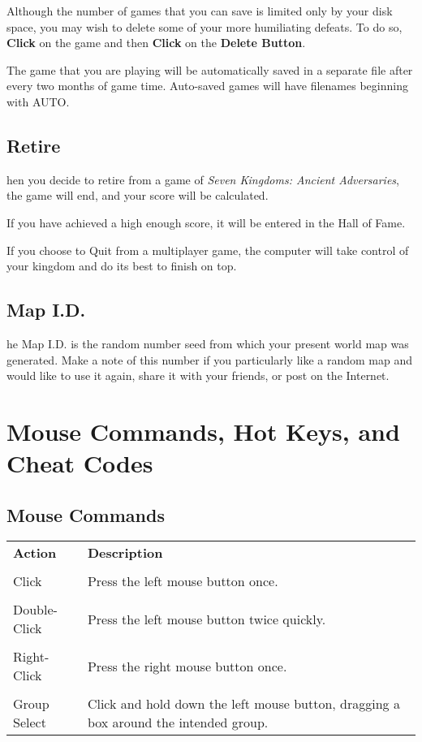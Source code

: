 Although the number of games that you can save is limited only by your disk space, you may wish to delete some of your more humiliating defeats. To do so, \textbf{Click} on the game and then \textbf{Click} on the \textbf{Delete Button}.

The game that you are playing will be automatically saved in a separate file after every two months of game time. Auto-saved games will have filenames beginning with AUTO.

\subsection{\textsf{Retire}}


hen you decide to retire from a game of \textit{Seven Kingdoms: Ancient Adversaries}, the game will end, and your score will be calculated.

If you have achieved a high enough score, it will be entered in the Hall of Fame.

If you choose to Quit from a multiplayer game, the computer will take control of your kingdom and do its best to finish on top.

\subsection{\textsf{Map I.D.}}


he Map I.D. is the random number seed from which your present world map was generated. Make a note of this number if you particularly like a random map and would like to use it again, share it with your friends, or post on the Internet.

\section{\textsf{Mouse Commands, Hot Keys, and Cheat Codes}}

\subsection{\textsf{Mouse Commands}}


\begin{tabular}{p{1in} p{3in}}
    \textbf{Action} & \textbf{Description} \\ \\
    Click & Press the left mouse button once. \\ \\
    Double-Click & Press the left mouse button twice quickly. \\ \\
    Right-Click & Press the right mouse button once. \\ \\
    Group Select & Click and hold down the left mouse button, dragging a box around the intended group. \\
\end{tabular}    
    
